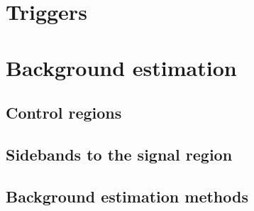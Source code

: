 

\section{Triggers}
\label{sec:htoinv_triggers}

\section{Background estimation}
\label{sec:htoinv_background_est}

\subsection{Control regions}
\label{subsec:htoinv_crs}

\subsection{Sidebands to the signal region}
\label{subsec:htoinv_sidebands}

\subsection{Background estimation methods}
\label{subsec:htoinv_background_methods}
